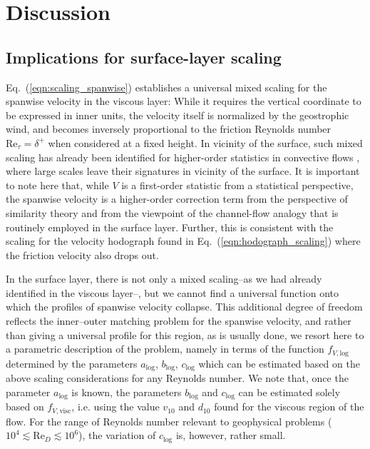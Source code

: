 \documentclass[smallcondensed,final]{svjour3}
\newcommand{\RE}{\mathrm{Re}}
\begin{document}
\section{Discussion}
\subsection{Implications for surface-layer scaling} 
Eq.~(\ref{eqn:scaling_spanwise}) establishes a universal mixed scaling for the spanwise velocity
in the viscous layer:
%
While it requires the vertical coordinate to be expressed in inner units,
the velocity itself is normalized by the geostrophic wind, and becomes
inversely proportional to the friction Reynolds number $\RE_\tau=\delta^+$
when considered at a fixed height.
%
In vicinity of the surface, such mixed scaling has already been identified for higher-order statistics in convective 
flows \citep{mellado:BM2016,li:JAS2018}, where large scales leave their signatures in vicinity of the surface.
%
It is important to note here that, while $V$ is a first-order statistic from a statistical perspective,
the spanwise velocity is a higher-order correction term from the perspective of similarity theory and
from the viewpoint of the channel-flow analogy that is routinely employed in the surface layer.
%
Further, this is consistent with the scaling for the velocity hodograph found in
Eq.~(\ref{eqn:hodograph_scaling}) where the friction velocity also drops out.
%
\par
%
In the surface layer, there is not only a mixed scaling--as we had already identified
in the viscous layer--, but we cannot find a universal function onto which the profiles
of spanwise velocity collapse. 
%
This additional degree of freedom reflects the inner--outer matching problem for the
spanwise velocity, and rather than giving a universal profile for this region,
as is usually done, we resort here to a parametric description of the problem,
namely in terms of the function $f_{V,\mathrm{log}}$ determined by the
parameters $a_\mathrm{log}$, $b_\mathrm{log}$, $c_\mathrm{log}$ which can be estimated
based on the above scaling considerations for any Reynolds number. 
%
We note that, once the parameter $a_\mathrm{log}$ is known, the parameters $b_\mathrm{log}$
and $c_\mathrm{log}$ can be estimated solely based on $f_{V,\mathrm{visc}}$, i.e. using the
value $v_{10}$ and $d_{10}$ found for the viscous region of the flow.
%
For the range of Reynolds number relevant to geophysical problems ($10^4\lesssim \RE_D \lesssim 10^6$),
the variation of $c_\mathrm{log}$ is, however, rather small.
\end{document}
